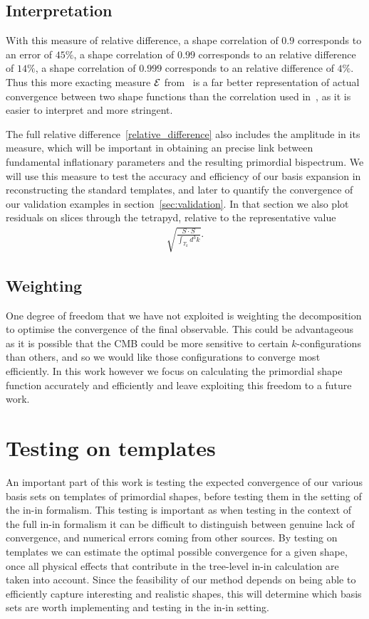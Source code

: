     \subsection{Interpretation}
With this measure of relative difference, a shape correlation of $0.9$ corresponds to an error of $45\%$,
a shape correlation of $0.99$ corresponds to an relative difference of $14\%$,
a shape correlation of $0.999$ corresponds to an relative difference of $4\%$.
Thus this more exacting measure $\mathcal{E}$ from~\cite{hung_1902} is a far better representation of actual convergence
between two shape functions
than the correlation used in~\cite{Funakoshi}, as it is easier to interpret and
more stringent.


The full relative difference~\eqref{relative_difference} also includes the amplitude
in its measure, which will be important in obtaining an precise link
between fundamental inflationary parameters and the resulting primordial bispectrum.
We will use this measure to test the accuracy and efficiency of our basis expansion
in reconstructing the standard templates, and later to quantify the convergence
of our validation examples in section~\ref{sec:validation}.
In that section we also plot residuals on slices through the tetrapyd,
relative to the representative value
\begin{align}\label{rep_val}
    \sqrt{\frac{S\cdot S}{\int_{T_k} d^3k}}.
\end{align}


    \subsection{Weighting}
    One degree of freedom that we have not exploited is weighting the decomposition
    to optimise the convergence of the final observable.
    This could be advantageous as it is possible that the CMB could be more sensitive
    to certain $k$-configurations than others, and so we would like those configurations to
    converge most efficiently.
    In this work however we focus on calculating the primordial shape function accurately
    and efficiently and leave exploiting this freedom to a future work.
\section{Testing on templates}
    An important part of this work is testing the expected convergence of our various
    basis sets on templates of primordial shapes, before testing them in the setting
    of the in-in formalism.
    This testing is important as when testing in the context of the full in-in formalism
    it can be difficult to distinguish between genuine lack of convergence, and
    numerical errors coming from other sources.
    By testing on templates we can estimate the optimal possible
    convergence for a given shape, once all physical effects that contribute
    in the tree-level in-in calculation are taken into account.
    Since the feasibility of our method depends on being able
    to efficiently capture interesting and realistic shapes, this will determine
    which basis sets are worth implementing and testing in the in-in setting.


